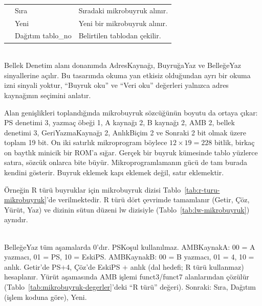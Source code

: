 \begin{table}[htbp]
\begin{tabular}{llp{8cm}}
 & Sıra & Sıradaki mikrobuyruk alınır. \\
 & Yeni & Yeni bir mikrobuyruk alınır. \\
 & Dağıtım tablo\_no & Belirtilen tablodan çekilir. \\
\bottomrule
\end{tabular}
\\[0.3em]
{\scriptsize Bellek Denetim alanı donanımda AdresKaynağı, BuyruğaYaz ve BelleğeYaz sinyallerine açılır. Bu tasarımda okuma yan etkisiz olduğundan ayrı bir okuma izni sinyali yoktur, ``Buyruk oku'' ve ``Veri oku'' değerleri yalnızca adres kaynağının seçimini anlatır.}
\end{table}

Alan genişlikleri toplandığında mikrobuyruk sözcüğünün boyutu da ortaya çıkar: PS denetimi 3, yazmaç öbeği 1, A kaynağı 2, B kaynağı 2, AMB 2, bellek denetimi 3, GeriYazmaKaynağı 2, AnlıkBiçim 2 ve Sonraki 2 bit olmak üzere toplam 19 bit. On iki satırlık mikroprogram böylece $12 \times 19 = 228$ bitlik, birkaç on baytlık minicik bir ROM'a sığar. Gerçek bir buyruk kümesinde tablo yüzlerce satıra, sözcük onlarca bite büyür. Mikroprogramlamanın gücü de tam burada kendini gösterir. Buyruk eklemek kapı eklemek değil, satır eklemektir.

Örneğin R türü buyruklar için mikrobuyruk dizisi Tablo~\ref{tab:r-turu-mikrobuyruk}'de verilmektedir. R türü dört çevrimde tamamlanır (Getir, Çöz, Yürüt, Yaz) ve dizinin sütun düzeni lw dizisiyle (Tablo~\ref{tab:lw-mikrobuyruk}) aynıdır.

\begin{table}[htbp]
\centering
\caption{R türü buyruklar için mikrobuyruk dizisi}
\label{tab:r-turu-mikrobuyruk}
\footnotesize
{}
\\[0.3em]
{\scriptsize BelleğeYaz tüm aşamalarda 0'dır. PSKoşul kullanılmaz. AMBKaynakA: 00 = A yazmacı, 01 = PS, 10 = EskiPS. AMBKaynakB: 00 = B yazmacı, 01 = 4, 10 = anlık. Getir'de PS$+$4, Çöz'de EskiPS $+$ anlık (dal hedefi; R türü kullanmaz) hesaplanır. Yürüt aşamasında AMB işlemi funct3/funct7 alanlarından çözülür (Tablo~\ref{tab:mikrobuyruk-degerler}'deki ``R türü'' değeri). Sonraki: Sıra, Dağıtım (işlem koduna göre), Yeni.}
\end{table}

